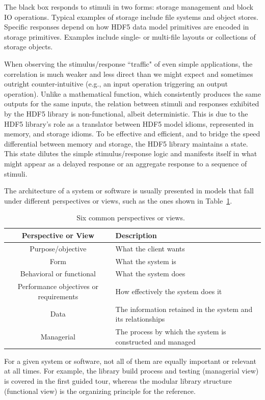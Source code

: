 The black box responds to stimuli in two forms: storage management and block IO operations. Typical examples of storage include file systems and object stores. Specific responses depend on how HDF5 data model primitives are encoded in storage primitives. Examples include single- or multi-file layouts or collections of storage objects.

When observing the stimulus/response ``traffic" of even simple applications, the correlation is much weaker and less direct than we might expect and sometimes outright counter-intuitive (e.g., an input operation triggering an output operation). Unlike a mathematical function, which consistently produces the same outputs for the same inputs, the relation between stimuli and responses exhibited by the HDF5 library is non-functional, albeit deterministic. This is due to the HDF5 library's role as a translator between HDF5 model idioms, represented in memory, and storage idioms. To be effective and efficient, and to bridge the speed differential between memory and storage, the HDF5 library maintains a state. This state dilutes the simple stimulus/response logic and manifests itself in what might appear as a delayed response or an aggregate response to a sequence of stimuli.

The architecture of a system or software is usually presented in models that fall under different perspectives or views, such as the ones shown in Table~\ref{table:perspectives}.

\begin{table}[h!]
\begin{tabular}{||c|l||}
\hline
Perspective or View & Description \\  [0.5ex] 
\hline\hline
Purpose/objective & What the client wants \\  
Form & What the system is \\
Behavioral or functional & What the system does\\
Performance objectives or requirements & How effectively the system does it\\
Data & The information retained in the system and its relationships\\
Managerial & The process by which the system is constructed and managed\\ [1ex] 
\hline
\end{tabular}
\caption{Six common perspectives or views.~\cite{maier2009}}
\label{table:perspectives}
\end{table}

For a given system or software, not all of them are equally important or relevant at all times. For example, the library build process and testing (managerial view) is covered in the first guided tour, whereas the modular library structure (functional view) is the organizing principle for the reference.

